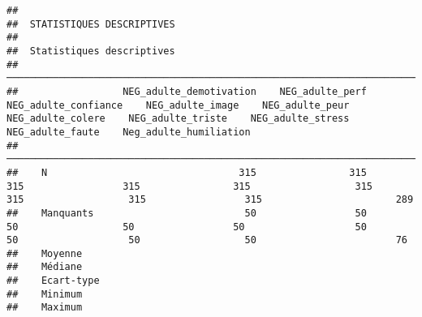 \documentclass[
]{article}
\begin{document}
\begin{verbatim}
## 
##  STATISTIQUES DESCRIPTIVES
## 
##  Statistiques descriptives                                                                                                                                                                                                                
##  ──────────────────────────────────────────────────────────────────────────────────────────────────────────────────────────────────────────────────────────────────────────────────────────────────────────────────────────────────────── 
##                  NEG_adulte_demotivation    NEG_adulte_perf    NEG_adulte_confiance    NEG_adulte_image    NEG_adulte_peur    NEG_adulte_colere    NEG_adulte_triste    NEG_adulte_stress    NEG_adulte_faute    Neg_adulte_humiliation   
##  ──────────────────────────────────────────────────────────────────────────────────────────────────────────────────────────────────────────────────────────────────────────────────────────────────────────────────────────────────────── 
##    N                                 315                315                     315                 315                315                  315                  315                  315                 315                       289   
##    Manquants                          50                 50                      50                  50                 50                   50                   50                   50                  50                        76   
##    Moyenne                                                                                                                                                                                                                                
##    Médiane                                                                                                                                                                                                                                
##    Ecart-type                                                                                                                                                                                                                             
##    Minimum                                                                                                                                                                                                                                
##    Maximum                                                                                                                                                                                                                                

\end{verbatim}
\end{document}
